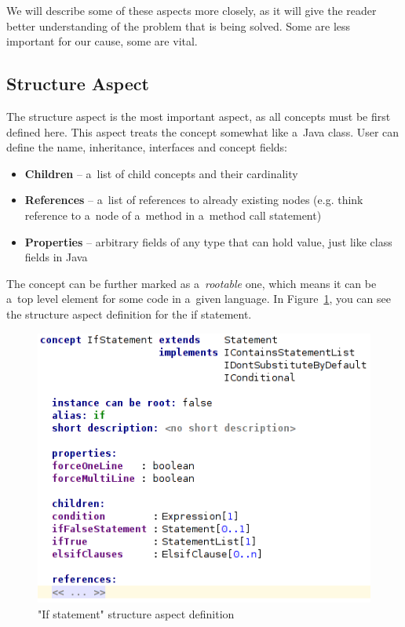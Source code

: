 We will describe some of these aspects more closely, as it will give the reader better understanding of the problem that is being solved.
Some are less important for our cause, some are vital.

\subsection{Structure Aspect}

The structure aspect is the most important aspect, as all concepts must be first defined here.
This aspect treats the concept somewhat like a~Java class.
User can define the name, inheritance, interfaces and concept fields:

\begin{itemize}
	\item \textbf{Children} -- a~list of child concepts and their cardinality

	\item \textbf{References} -- a~list of references to already existing nodes (e.g. think reference to a~node of a~method in a~method call statement)

	\item \textbf{Properties} -- arbitrary fields of any type that can hold value, just like class fields in Java
\end{itemize}

The concept can be further marked as a~\textit{rootable} one, which means it can be a~top level element for some code in a~given language.
In Figure~\ref{fig:if_statement_structure}, you can see the structure aspect definition for the if statement.

\begin{figure}[h]
	\centering
	\includegraphics[scale=0.75]{./img/if_statement_structure.png}
	\caption{"If statement" structure aspect definition}
	\label{fig:if_statement_structure}
\end{figure}

